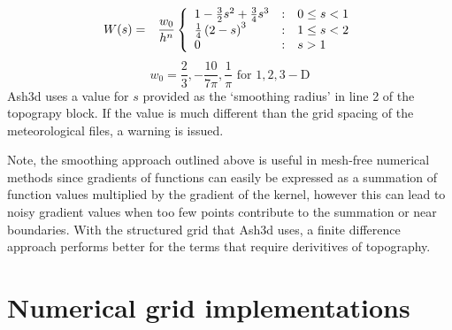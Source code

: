 \begin{eqnarray*}
W(s) &=& \frac{w_0}{h^n} \left\{ \begin{array}
{l@{\quad:\quad}l}
1-\frac{3}{2}s^2+\frac{3}{4}s^3
& 0\le s<1 \\
\frac{1}{4}\left(2-s\right)^3
& 1\le s<2 \\
0 & s>1
\end{array}
\right.\nonumber \\
\end{eqnarray*}
\[
w_0=\frac{2}{3},-\frac{10}{7\pi} ,\frac{1}{\pi} \,\, \mathrm{for} \,\, \mathrm{1,2,3-D}
\]
Ash3d uses a value for $s$ provided as the `smoothing radius' in line 2 of the
topograpy block. If the value is much different than the grid spacing of the
meteorological files, a warning is issued.

Note, the smoothing approach outlined above is useful in mesh-free numerical
methods since gradients of functions can easily be expressed as a summation
of function values multiplied by the gradient of the kernel, however this can
lead to noisy gradient values when too few points contribute to the summation
or near boundaries. With the structured grid that Ash3d uses, a finite difference
approach performs better for the terms that require derivitives of topography.

\section{Numerical grid implementations}\label{ChapAppendTopo_Sec_GridImp}

